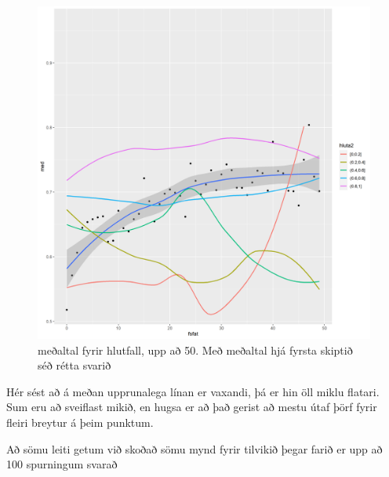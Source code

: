 \documentclass[
  12pt,
]{article}
\begin{document}
\begin{figure}[H]

{\centering \includegraphics[width=1\linewidth]{Img/meabwhsbyhlutfall} 

}

\caption{meðaltal fyrir hlutfall, upp að 50. Með meðaltal hjá fyrsta skiptið séð rétta svarið}\label{fig:meanbyhlutfallandhsta}
\end{figure}

Hér sést að á meðan upprunalega línan er vaxandi, þá er hin öll miklu flatari. Sum eru að sveiflast mikið, en hugsa er að það gerist að mestu útaf þörf fyrir fleiri breytur á þeim punktum.

Að sömu leiti getum við skoðað sömu mynd fyrir tilvikið þegar farið er upp að 100 spurningum svarað
\end{document}
